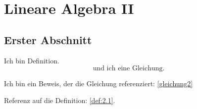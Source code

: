 \chapter{Lineare Algebra II} %
\label{cha:2}
\setcounter{section}{0}
\section{Erster Abschnitt}

\begin{definition}
	\label{def:2.1}
	Ich bin Definition.
	\begin{equation}
		\text{und ich eine Gleichung.} \label{gleichung2}
	\end{equation}
\end{definition}

\begin{beweis}
	Ich bin ein Beweis, der die Gleichung referenziert: \eqref{gleichung2}
\end{beweis}

Referenz auf die Definition: \ref{def:2.1}.


\cleardoubleoddemptypage